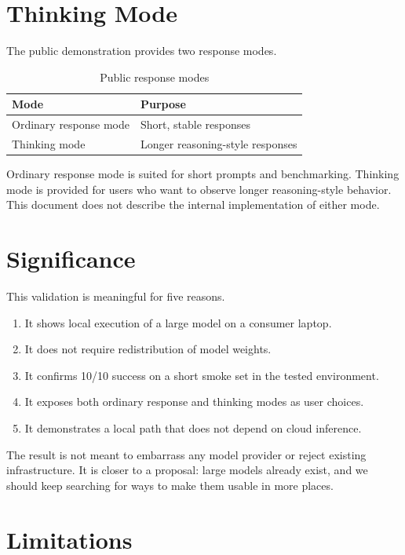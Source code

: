 \documentclass[11pt]{article}
\begin{document}
\section{Thinking Mode}

The public demonstration provides two response modes.

\begin{table}[h]
\centering
\begin{tabular}{ll}
\toprule
Mode & Purpose \\
\midrule
Ordinary response mode & Short, stable responses \\
Thinking mode & Longer reasoning-style responses \\
\bottomrule
\end{tabular}
\caption{Public response modes}
\end{table}

Ordinary response mode is suited for short prompts and benchmarking. Thinking mode is provided for users who want to observe longer reasoning-style behavior. This document does not describe the internal implementation of either mode.

\section{Significance}

This validation is meaningful for five reasons.

\begin{enumerate}[leftmargin=1.5em]
  \item It shows local execution of a large model on a consumer laptop.
  \item It does not require redistribution of model weights.
  \item It confirms 10/10 success on a short smoke set in the tested environment.
  \item It exposes both ordinary response and thinking modes as user choices.
  \item It demonstrates a local path that does not depend on cloud inference.
\end{enumerate}

The result is not meant to embarrass any model provider or reject existing infrastructure. It is closer to a proposal: large models already exist, and we should keep searching for ways to make them usable in more places.

\section{Limitations}
\end{document}
